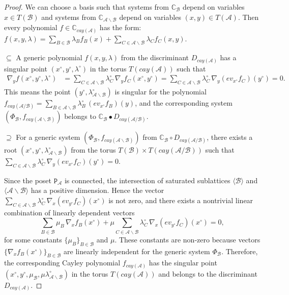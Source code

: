 \documentclass[11pt]{article}
\theoremstyle{plain}
\theoremstyle{definition}
\theoremstyle{remark}
\theoremstyle{plain}
\theoremstyle{plain}
\theoremstyle{plain}
\theoremstyle{definition}
\begin{document}
\begin{proof}
We can choose a basis such that systems from $\mathbb{C}_{\mathscr{B}}$
depend on variables $x\in T(\mathscr{B})$ and systems from $\mathbb{C}_{\mathscr{A}\backslash\mathscr{B}}$
depend on variables $(x,y)\in T(\mathscr{A}).$ Then every polynomial
$f\in\mathbb{C}_{cay(\mathscr{A})}$ has the form: $f(x,y,\lambda)=\underset{B\in\mathscr{B}}{\sum}\lambda_{B}f_{B}(x)+\underset{C\in\mathscr{A}\backslash\mathscr{B}}{\sum}\lambda_{C}f_{C}(x,y).$

$\boxed{\subseteq}$ A generic polynomial $f(x,y,\lambda)$ from the
discriminant $D_{cay(\mathscr{A})}$ has a singular point $(x^{\circ},y^{\circ},\lambda^{\circ})$
in the torus $T(cay(\mathscr{A}))$ such that
\begin{align*}
\nabla_{y}f(x^{\circ},y^{\circ},\lambda^{\circ}) & =\underset{C\in\mathscr{A}\backslash\mathscr{B}}{\sum}\lambda_{C}^{\circ}\,\nabla_{y}f_{C}(x^{\circ},y^{\circ})=\underset{C\in\mathscr{A}\backslash\mathscr{B}}{\sum}\lambda_{C}^{\circ}\,\nabla_{y}(ev_{x^{\circ}}f_{C})(y^{\circ})=0.
\end{align*}
This means the point $(y^{\circ},\lambda_{\mathscr{A}\backslash\mathscr{B}}^{\circ})$
is singular for the polynomial $f_{cay(\mathscr{A}/\mathscr{B})}=\underset{B\in\mathscr{A}\backslash\mathscr{B}}{\sum}\lambda_{B}^{\circ}\,(ev_{x^{\circ}}f_{B})(y)$,
and the corresponding system $(\Phi_{\mathscr{B}},f_{cay(\mathscr{A}\backslash\mathscr{B})})$
belongs to $\mathbb{C}_{\mathscr{B}}\bullet D_{cay(\mathscr{A}/\mathscr{B})}$.

$\boxed{\supseteq}$ For a generic system $(\Phi_{\mathscr{B}},f_{cay(\mathscr{A}\backslash\mathscr{B})})$
from $\mathbb{C}_{\mathscr{B}}\circ D_{cay(\mathscr{A}/\mathscr{B})}$,
there exists a root $(x^{\circ},y^{\circ},\lambda_{\mathscr{A}\backslash\mathscr{B}}^{\circ})$
from the torus $T(\mathscr{B})\times T(cay(\mathscr{A}/\mathscr{B}))$
such that $\underset{C\in\mathscr{A}\backslash\mathscr{B}}{\sum}\lambda_{C}^{\circ}\,\nabla_{y}(ev_{x^{\circ}}f_{C})(y^{\circ})=0$. 

Since the poset $\mathtt{P}_{\mathscr{A}}$ is connected, the intersection
of saturated sublattices $\mathscr{\langle\mathscr{B}}\rangle$ and
$\langle\mathscr{A}\backslash\mathscr{B}\rangle$ has a positive dimension.
Hence the vector $\underset{C\in\mathscr{A}\backslash\mathscr{B}}{\sum}\lambda_{C}^{\circ}\,\nabla_{x}(ev_{y^{\circ}}f_{C})(x^{\circ})$
is not zero, and there exists a nontrivial linear combination of linearly
dependent vectors
\[
\underset{B\in\mathscr{B}}{\sum}\mu_{B}\,\nabla_{x}f_{B}(x^{\circ})+\mu\underset{C\in\mathscr{A}\backslash\mathscr{B}}{\sum}\lambda_{C}^{\circ}\,\nabla_{x}(ev_{y^{\circ}}f_{C})(x^{\circ})=0,
\]
for some constants $\{\mu_{B}\}_{B\in\mathscr{B}}$ and $\mu$. These
constants are non-zero because vectors $\{\nabla_{x}f_{B}(x^{\circ})\}_{B\in\mathscr{B}}$
are linearly independent for the generic system $\Phi_{\mathscr{B}}$.
Therefore, the corresponding Cayley polynomial $f_{cay(\mathscr{A})}$
has the singular point $(x^{\circ},y^{\circ},\mu_{\mathscr{B}},\mu\lambda_{\mathscr{A}\backslash\mathscr{B}}^{\circ})$
in the torus $T(cay(\mathscr{A}))$ and belongs to the discriminant
$D_{cay(\mathscr{A})}$.
\end{proof}
\end{document}
